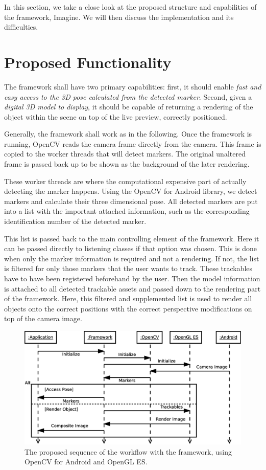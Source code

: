 \label{framework}

In this section, we take a close look at the proposed structure and capabilities of the framework, Imagine.
We will then discuss the implementation and its difficulties.

\section{Proposed Functionality}

The framework shall have two primary capabilities: first, it should enable \textit{fast and easy access to the 3D pose calculated from the detected marker}.
Second, given a \textit{digital 3D model to display}, it should be capable of returning a rendering of the object within the scene on top of the live preview, correctly positioned.

Generally, the framework shall work as in the following.
Once the framework is running, OpenCV reads the camera frame directly from the camera.
This frame is copied to the worker threads that will detect markers.
The original unaltered frame is passed back up to be shown as the background of the later rendering.

These worker threads are where the computational expensive part of actually detecting the marker happens.
Using the OpenCV for Android library, we detect markers and calculate their three dimensional pose.
All detected markers are put into a list with the important attached information, such as the corresponding identification number of the detected marker.

This list is passed back to the main controlling element of the framework.
Here it can be passed directly to listening classes if that option was chosen.
This is done when only the marker information is required and not a rendering.
If not, the list is filtered for only those markers that the user wants to track.
These trackables have to have been registered beforehand by the user.
Then the model information is attached to all detected trackable assets and passed down to the rendering part of the framework.
Here, this filtered and supplemented list is used to render all objects onto the correct positions with the correct perspective modifications on top of the camera image.

\begin{figure}[H]
	\centering
	\includegraphics[width=12cm]{img/sequence_access.eps}
	\caption[Access Sequence.]{The proposed sequence of the workflow with the framework, using OpenCV for Android and OpenGL ES.}
	\label{fig:sequence_access}
\end{figure}


